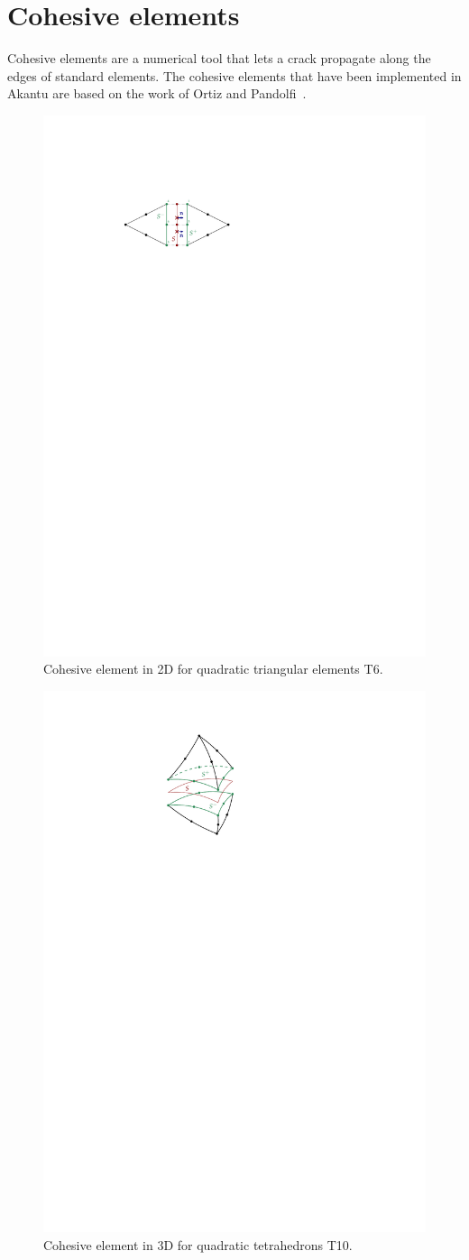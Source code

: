 
\section{Cohesive elements}

Cohesive elements are a numerical tool that lets a crack propagate
along the edges of standard elements. The cohesive elements that have
been implemented in Akantu are based on the work of Ortiz and
Pandolfi~\cite{ortiz1999}.

\begin{figure}
  \centering
  \includegraphics[width=.6\textwidth]{figures/cohesive2d}
  \caption{Cohesive element in 2D for quadratic triangular elements
    T6.}
  \label{fig:smm:coh:cohesive2d}
\end{figure}

\begin{figure}
  \centering
  \includegraphics[width=.25\textwidth]{figures/cohesive3d}
  \caption{Cohesive element in 3D for quadratic tetrahedrons T10.}
  \label{fig:smm:coh:cohesive3d}
\end{figure}

